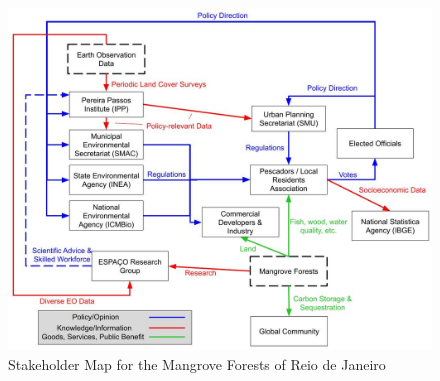 \chapter{} \label{ch:mangroves}



\section{}

\begin{figure}[h]
	\centering
	\includegraphics[scale=0.3]{Figures/chap4/Stakeholder_Map_v2.jpg}
	\caption[Stakeholder Map for the Mangrove Forests of Reio de Janeiro]{Stakeholder Map for the Mangrove Forests of Reio de Janeiro}
	\label{fig:rio_stakemap}
\end{figure}


\section{}


